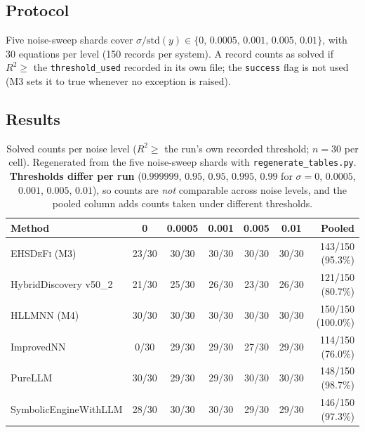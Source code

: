 \documentclass[twoside,11pt]{article}
\newcommand{\EHD}{\textsc{EHSDeFi}}
\newcommand{\HSL}{\textsc{HLLMNN}}
\newcommand{\Rsq}{R^{2}}
\begin{document}
\subsection{Protocol}

Five noise-sweep shards cover $\sigma/\mathrm{std}(y)\in\{0,\,0.0005,\,0.001,\,0.005,\,0.01\}$,
with 30 equations per level (150 records per system). A record counts as
solved if $\Rsq\geq$ the \texttt{threshold\_used} recorded in its own file; the
\texttt{success} flag is not used (M3 sets it to true whenever no exception is
raised).

\subsection{Results}

\begin{table}[H]
\centering
\caption{Solved counts per noise level ($\Rsq\geq$ the run's own recorded
  threshold; $n=30$ per cell). Regenerated from the five noise-sweep shards
  with \texttt{regenerate\_tables.py}. \textbf{Thresholds differ per run}
  ($0.999999$, $0.95$, $0.95$, $0.995$, $0.99$ for $\sigma=0$, $0.0005$,
  $0.001$, $0.005$, $0.01$), so counts are \emph{not} comparable across noise
  levels, and the pooled column adds counts taken under different thresholds.}
\label{tab:noise_sensitivity}
\small
\setlength{\tabcolsep}{4pt}
\begin{tabular}{@{}l c c c c c r@{}}
\toprule
\textbf{Method} & \textbf{0} & \textbf{0.0005} & \textbf{0.001} & \textbf{0.005} & \textbf{0.01} & \textbf{Pooled}\\
\midrule
\EHD{} (M3)            & 23/30 & 30/30 & 30/30 & 30/30 & 30/30 & 143/150 (95.3\%)\\
HybridDiscovery v50\_2 & 21/30 & 25/30 & 26/30 & 23/30 & 26/30 & 121/150 (80.7\%)\\
\HSL{} (M4)            & 30/30 & 30/30 & 30/30 & 30/30 & 30/30 & 150/150 (100.0\%)\\
ImprovedNN             &  0/30 & 29/30 & 29/30 & 27/30 & 29/30 & 114/150 (76.0\%)\\
PureLLM                & 30/30 & 29/30 & 29/30 & 30/30 & 30/30 & 148/150 (98.7\%)\\
SymbolicEngineWithLLM  & 28/30 & 30/30 & 30/30 & 29/30 & 29/30 & 146/150 (97.3\%)\\
\bottomrule
\end{tabular}
\end{table}
\end{document}
